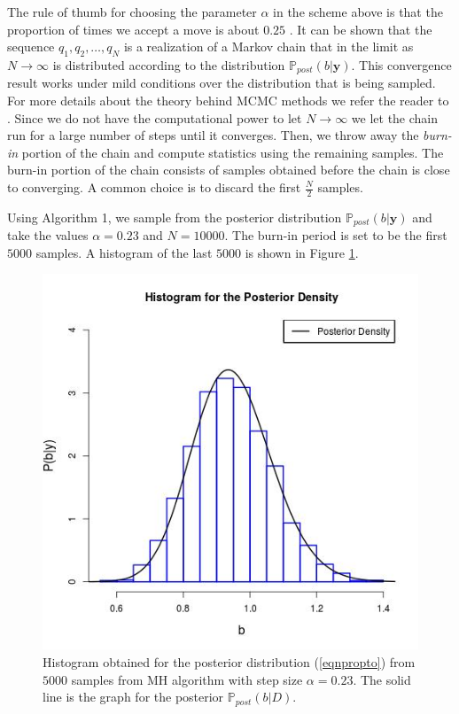 \documentclass{sfuthesis}
\newcommand{\post}{\mathbb{P}_{post}}
\newcommand{\y}{\textbf{y}}
\begin{document}
The rule of thumb for choosing the parameter $\alpha$ in the scheme above is that   the proportion of times we accept
a move 
is about $0.25$ \cite{casella2008monte}. It can be shown that the sequence $q_{1},q_{2},\ldots,q_{N}$
is a realization of a Markov chain that in the limit as $N\rightarrow\infty$ is distributed according to the distribution
$\post(b|\y)$. This convergence result works under mild conditions over the distribution that is being sampled.
For more details about the theory behind MCMC methods we refer the reader to \cite{casella2008monte}. 
Since we do not have the computational power to let $N\rightarrow\infty$ we let the chain run for a large number of steps
until it converges. Then, we throw away the \textit{burn-in} portion of the chain and compute statistics using 
the remaining samples.  The burn-in portion of the chain consists of samples obtained before the chain is close 
to converging. A common choice is to discard the first $\frac{N}{2}$ samples.
\newline


Using Algorithm 1, we sample from the posterior distribution $\post(b|\y)$ and take the values $\alpha=0.23$
and $N=10000$. The  burn-in  period is set to be  the first $5000$ samples. A histogram of the last $5000$
is shown in Figure \ref{figToyMCMC}.

%


\begin{figure}[H]
\centering
\includegraphics[scale=0.60]{./FigChap3/histogram_mcmc.jpg}
\caption{Histogram obtained for the posterior distribution (\ref{eqnpropto}) 
from $5000$ samples from MH algorithm with step size $\alpha=0.23$. The solid line
is the  graph for the posterior $\post(b|D)$.}
\label{figToyMCMC}
\end{figure}
\end{document}
